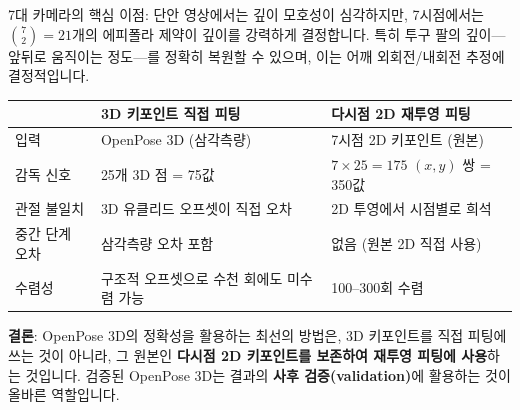 \documentclass[11pt, a4paper]{report}
\begin{document}
\begin{keyidea}
7대 카메라의 핵심 이점: 단안 영상에서는 깊이 모호성이 심각하지만, 7시점에서는 $\binom{7}{2} = 21$개의 에피폴라 제약이 깊이를 강력하게 결정합니다. 특히 투구 팔의 깊이---앞뒤로 움직이는 정도---를 정확히 복원할 수 있으며, 이는 어깨 외회전/내회전 추정에 결정적입니다.
\end{keyidea}

\begin{importantnote}[title={다시점 피팅 경로 비교}]

\begin{center}
\renewcommand{\arraystretch}{1.3}
\small
\begin{tabular}{p{3cm}p{4cm}p{4cm}}
\toprule
& \textbf{3D 키포인트 직접 피팅} & \textbf{다시점 2D 재투영 피팅} \\
\midrule
입력 & OpenPose 3D (삼각측량) & 7시점 2D 키포인트 (원본) \\
감독 신호 & 25개 3D 점 = 75값 & $7 \times 25 = 175$ $(x,y)$ 쌍 = 350값 \\
관절 불일치 & 3D 유클리드 오프셋이 직접 오차 & 2D 투영에서 시점별로 희석 \\
중간 단계 오차 & 삼각측량 오차 포함 & 없음 (원본 2D 직접 사용) \\
수렴성 & 구조적 오프셋으로 수천 회에도 미수렴 가능 & 100--300회 수렴 \\
\bottomrule
\end{tabular}
\end{center}

\textbf{결론}: OpenPose 3D의 정확성을 활용하는 최선의 방법은, 3D 키포인트를 직접 피팅에 쓰는 것이 아니라,
그 원본인 \textbf{다시점 2D 키포인트를 보존하여 재투영 피팅에 사용}하는 것입니다.
검증된 OpenPose 3D는 결과의 \textbf{사후 검증(validation)}에 활용하는 것이 올바른 역할입니다.
\end{importantnote}
\end{document}
